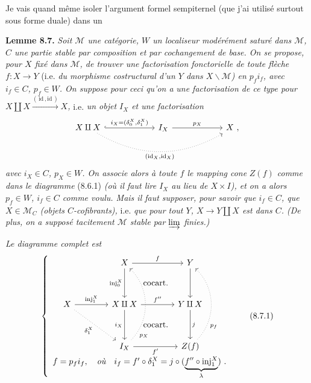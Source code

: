 \documentclass[11pt]{article}
\newcommand{\printedpage}[1]{\marginpar{\raggedright\footnotesize p.~#1}}
\newcommand{\msp}[1]{\marginpar{\raggedright\footnotesize [#1]}}
\begin{document}
Je vais quand même isoler l'argument formel sempiternel (que j'ai utilisé surtout sous forme duale) dans un

\textbf{Lemme 8.7.} \textit{Soit $\mathcal{M}$ une catégorie, $W$ un localiseur modérément saturé dans $\mathcal{M}$, $C$ une partie stable par composition et par cochangement de base. On se propose, pour $X$ fixé dans $\mathcal{M}$, de trouver une factorisation fonctorielle de toute flèche $f : X \longrightarrow Y$} (i.e. \textit{du morphisme costructural d'un $Y$ dans $X\backslash\mathcal{M}$) en $p_f i_f$, avec $i_f \in C$, $p_f \in W$. On suppose pour ceci qu'on a}
\msp{page 113}
\textit{une factorisation de ce type pour $X \amalg X \xrightarrow{(\,\mathrm{id}\,,\mathrm{id}\,)} X$,} i.e. \textit{un objet $I_X$ et une factorisation}
\[
\begin{tikzcd}[column sep=6em]
X \amalg X \arrow[r, hook, "{i_X = (\delta_0^X,\delta_1^X)}"] \arrow[rr, dotted, bend right, "{(\mathrm{id}_X,\mathrm{id}_X)}"'] & I_X \arrow[r, "p_X"] & X\ ,
\end{tikzcd}
\]
\textit{avec $i_X \in C$, $p_X \in W$. On associe alors à toute $f$ le mapping cone} \textit{$Z(f)$ comme dans le diagramme} (8.6.1) \textit{(où il faut lire $I_X$ au lieu de $X \times I$), et on a alors $p_f \in W$, $i_f \in C$ comme voulu. Mais il faut supposer, pour savoir que $i_f \in C$, que $X \in \mathcal{M}_C$ (objets $C$-cofibrants),} i.e. \textit{que pour tout $Y$, $X \longrightarrow Y \amalg X$ est dans $C$. (De plus, on a supposé tacitement $\mathcal{M}$ stable par $\varinjlim$ finies.)}

\printedpage{62}

\textit{Le diagramme complet est}
\[
\left\{
\begin{array}{c}
\begin{tikzcd}[ampersand replacement=\&,column sep=4em,row sep=3.5em]
 \& X \arrow[r, "f"] \arrow[d, "\mathrm{inj}_0^X"'] \arrow[dr, phantom, "\text{cocart.}"] \& Y \arrow[d] \\
X \arrow[r, "\mathrm{inj}_1^X"] \arrow[dr, dotted, "\delta_1^X"'] \& X \amalg X \arrow[r, "f''"] \arrow[d, "i_X"'] \arrow[dr, phantom, "\text{cocart.}"] \& Y \amalg X \arrow[d, "j"] \\
 \& I_X \arrow[r, "f'"'] \arrow[uu, dotted, bend right=45, "p_X"{pos=.12,swap}] \& Z(f) \arrow[uu, dotted, bend right=45, "p_f"{pos=.25,swap}]
\end{tikzcd}
\\[1ex]
f = p_f i_f, \quad \textit{où} \quad i_f = f' \circ \delta_1^X = j \circ (\underbrace{f'' \circ \mathrm{inj}_1^X}_{\lambda})\ .
\end{array}
\right.
\tag*{(8.7.1)}
\]
\end{document}

